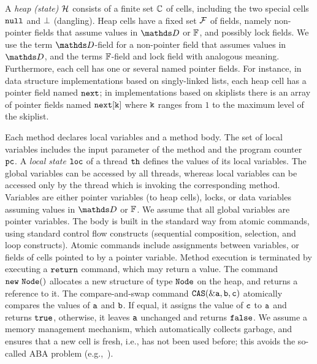 A {\it heap (state)} ${\mathcal H}$ consists of a finite set
${\mathbb C}$ of cells, including the two special cells
${\tt null}$ and $\bot$ (dangling).
Heap cells have a fixed set $\mathcal{F}$ of fields, namely
non-pointer fields that assume values in
$\ddomain$ or $\mathbb{F}$, and possibly lock fields.
We use the term $\ddomain$-field for a non-pointer field that
assumes values in $\ddomain$, and the terms $\mathbb{F}$-field and lock field
with analogous meaning.
Furthermore, each cell has one or several named pointer fields.
For instance, in data structure implementations based on singly-linked lists,
each heap cell has a pointer field named $\tt next$; in implementations
based on skiplists there is an array of pointer fields named
$\tt next[k]$ where $\tt k$ ranges from $1$ to the maximum level of the
skiplist.

%
Each method declares local variables and a method body.
%
The set of local variables includes the input parameter of the method and
the program counter $\tt pc$.
A {\it local state} ${\tt loc}$ of a thread ${\tt th}$
defines  the values of its local variables.
The global variables can be
accessed by all threads, whereas local variables can be accessed only
by the thread which is invoking the corresponding method.
Variables are either pointer variables (to heap cells), locks, or data variables assuming values in $\ddomain$ or $\mathbb{F}$.
We assume that all global variables are pointer variables.
%
%
%
The body is built in the standard way
from atomic commands, using standard control
flow constructs (sequential composition, selection, and loop constructs).
%
%
%
Atomic commands include assignments between variables, 
or fields of cells pointed to by a pointer variable.
%
Method execution is terminated by executing a $\tt return$ command,
which may return a value.
%
The command $\tt new\ Node()$ allocates a new structure of type
$\tt Node$ on the heap, and returns a reference to it.
%
The compare-and-swap command $\tt CAS(\&a,b,c)$ atomically
compares the values of $\tt a$ and $\tt b$.
If  equal, it assigns the value of
$\tt c$ to $\tt a$  and returns $\tt true$, 
otherwise, it leaves $\tt a$ unchanged and returns $\tt false$. 
We assume a memory management mechanism, which automatically collects
garbage, and ensures that a new cell is fresh, i.e., has
not been used before; this avoids the so-called
ABA problem (e.g.,~\cite{MS:QueueAlgorithms}).
%

